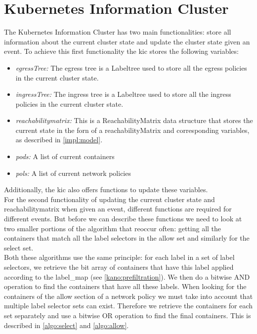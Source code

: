 \section{Kubernetes Information Cluster} \label{impl:Kic}
The Kubernetes Information Cluster has two main functionalities: store all information about the current cluster state and update the cluster state given an event. To achieve this first functionality the \acrshort{kic} stores the following variables:
\begin{itemize}
    \renewcommand{\labelitemi}{\scriptsize$\blacksquare$}
    \item \textit{egressTree:} The egress tree is a Labeltree used to store all the egress policies in the current cluster state.
    \item \textit{ingressTree:} The ingress tree is a Labeltree used to store all the ingress policies in the current cluster state.
    \item \textit{reachabilitymatrix:} This is a ReachabilityMatrix data structure that stores the current state in the forn of a reachabilityMatrix and corresponding variables, as described in \autoref{impl:model}.
    \item \textit{pods:} A list of current containers
    \item \textit{pols:} A list of current network policies
\end{itemize}
Additionally, the \acrshort{kic} also offers functions to update these variables. 
\\[10pt]
For the second functionality of updating the current cluster state and reachabilitymatrix when given an event, different functions are required for different events. But before we can describe these functions we need to look at two smaller portions of the algorithm that reoccur often: getting all the containers that match all the label selectors in the allow set and similarly for the select set.
\\[10pt]

Both these algorithms use the same principle: for each label in a set of label selectors, we retrieve the bit array of containers that have this label applied according to the label\_map (see \autoref{kano:prefiltration}). We then do a bitwise AND operation to find the containers that have all these labels. When looking for the containers of the allow section of a network policy we must take into account that multiple label selector sets can exist. Therefore we retrieve the containers for each set separately and use a bitwise OR operation to find the final containers. This is described in \autoref{algo:select} and \autoref{algo:allow}. 
\\[10pt]



